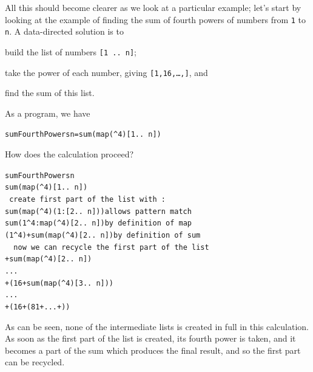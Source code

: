 All this should become clearer as we look at a particular example; let's start by looking at the example of finding the sum
of fourth powers of numbers from \texttt{1} to \texttt{n}. A data-directed
solution is to
\begin{titemize}
\item build the list of numbers \texttt{[1 ..\ n]};
\item take the power of each number, giving 
\texttt{[1,16,\ldots,]}, and
\item find the sum of this list.
\end{titemize}
As a program, we have
\begin{alltt}
sumFourthPowers n = sum (map (\^{}4) [1 ..\ n])
\end{alltt}
How does the calculation proceed?
\begin{alltt}
sumFourthPowers n 
\step sum (map (\^{}4) [1 ..\ n])
\ \hfill \mbox{\textrm{create first part of the list with \texttt{:}}}
\step sum (map (\^{}4) (1:[2 ..\ n]))\hfill \mbox{\textrm{allows pattern match}}
\step sum (1\^{}4 : map (\^{}4) [2 ..\ n])\hfill \mbox{\textrm{by definition of \texttt{map}}}
\step (1\^{}4) + sum (map (\^{}4) [2 ..\ n]) \hfill \mbox{\textrm{by definition of \texttt{sum}}}
\ \ \hfill \mbox{\textrm{now we can recycle the first part of the list}}
 + sum (map (\^{}4) [2 ..\ n]) 
\step ...
 + (16 + sum (map (\^{}4) [3 ..\ n])) 
\step ...
 + (16 + (81 + ... + )) 
\end{alltt}
As can be seen, none of the intermediate lists is created in full in this
calculation. As soon as the first part of the list is created, its fourth power is
taken, and it becomes a part of the sum which produces the final result, and so the first part can be recycled.


